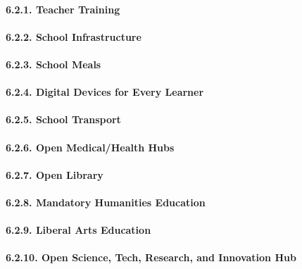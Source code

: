 \paragraph{6.2.1. Teacher Training}\label{teacher-training}

\paragraph{6.2.2. School Infrastructure}\label{school-infrastructure}

\paragraph{6.2.3. School Meals}\label{school-meals}

\paragraph{6.2.4. Digital Devices for Every
Learner}\label{digital-devices-for-every-learner}

\paragraph{6.2.5. School Transport}\label{school-transport}

\paragraph{6.2.6. Open Medical/Health
Hubs}\label{open-medicalhealth-hubs}

\paragraph{6.2.7. Open Library}\label{open-library}

\paragraph{6.2.8. Mandatory Humanities
Education}\label{mandatory-humanities-education}

\paragraph{6.2.9. Liberal Arts Education}\label{liberal-arts-education}

\paragraph{6.2.10. Open Science, Tech, Research, and Innovation
Hub}\label{open-science-tech-research-and-innovation-hub}

